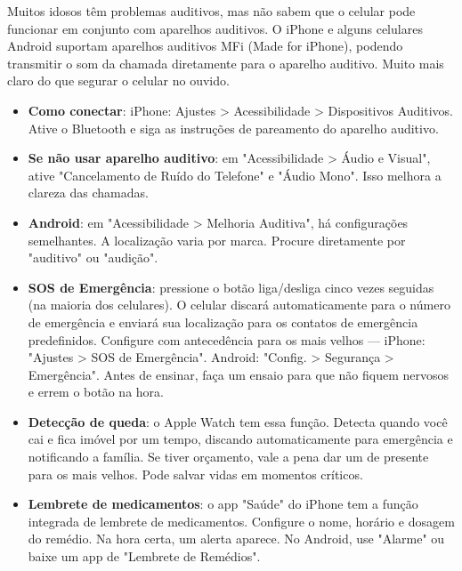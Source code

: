 
Muitos idosos têm problemas auditivos, mas não sabem que o celular pode funcionar em conjunto com aparelhos auditivos. O iPhone e alguns celulares Android suportam aparelhos auditivos MFi (Made for iPhone), podendo transmitir o som da chamada diretamente para o aparelho auditivo. Muito mais claro do que segurar o celular no ouvido.

\begin{itemize}
  \item \textbf{Como conectar}: iPhone: Ajustes > Acessibilidade > Dispositivos Auditivos. Ative o Bluetooth e siga as instruções de pareamento do aparelho auditivo.
  \item \textbf{Se não usar aparelho auditivo}: em "Acessibilidade > Áudio e Visual", ative "Cancelamento de Ruído do Telefone" e "Áudio Mono". Isso melhora a clareza das chamadas.
  \item \textbf{Android}: em "Acessibilidade > Melhoria Auditiva", há configurações semelhantes. A localização varia por marca. Procure diretamente por "auditivo" ou "audição".
\end{itemize}


\begin{itemize}
  \item \textbf{SOS de Emergência}: pressione o botão liga/desliga cinco vezes seguidas (na maioria dos celulares). O celular discará automaticamente para o número de emergência e enviará sua localização para os contatos de emergência predefinidos. Configure com antecedência para os mais velhos — iPhone: "Ajustes > SOS de Emergência". Android: "Config. > Segurança > Emergência". Antes de ensinar, faça um ensaio para que não fiquem nervosos e errem o botão na hora.
  \item \textbf{Detecção de queda}: o Apple Watch tem essa função. Detecta quando você cai e fica imóvel por um tempo, discando automaticamente para emergência e notificando a família. Se tiver orçamento, vale a pena dar um de presente para os mais velhos. Pode salvar vidas em momentos críticos.
  \item \textbf{Lembrete de medicamentos}: o app "Saúde" do iPhone tem a função integrada de lembrete de medicamentos. Configure o nome, horário e dosagem do remédio. Na hora certa, um alerta aparece. No Android, use "Alarme" ou baixe um app de "Lembrete de Remédios".
\end{itemize}

